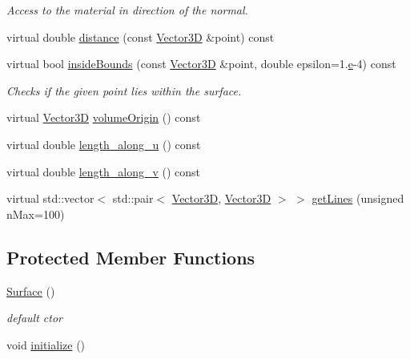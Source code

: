 \begin{DoxyCompactItemize}
\begin{DoxyCompactList}\small\item\em Access to the material in direction of the normal. \end{DoxyCompactList}\item 
virtual double \hyperlink{class_d_d4hep_1_1_d_d_rec_1_1_surface_ae673205d84823da5118cc1ae4a3403fb}{distance} (const \hyperlink{class_d_d_surfaces_1_1_vector3_d}{Vector3D} \&point) const
\item 
virtual bool \hyperlink{class_d_d4hep_1_1_d_d_rec_1_1_surface_a80a84ee1e6030a6df90f9cf6da06f041}{inside\+Bounds} (const \hyperlink{class_d_d_surfaces_1_1_vector3_d}{Vector3D} \&point, double epsilon=1.\hyperlink{_volumes_8cpp_a8a9a1f93e9b09afccaec215310e64142}{e}-\/4) const
\begin{DoxyCompactList}\small\item\em Checks if the given point lies within the surface. \end{DoxyCompactList}\item 
virtual \hyperlink{class_d_d_surfaces_1_1_vector3_d}{Vector3D} \hyperlink{class_d_d4hep_1_1_d_d_rec_1_1_surface_aef5510d93d3621e54f95fd3c62f8e5b3}{volume\+Origin} () const
\item 
virtual double \hyperlink{class_d_d4hep_1_1_d_d_rec_1_1_surface_afd98a91243f48c24fa45b3e812785401}{length\+\_\+along\+\_\+u} () const
\item 
virtual double \hyperlink{class_d_d4hep_1_1_d_d_rec_1_1_surface_ad28657a514fe91a4f5fa74cec1c3888d}{length\+\_\+along\+\_\+v} () const
\item 
virtual std\+::vector$<$ std\+::pair$<$ \hyperlink{class_d_d_surfaces_1_1_vector3_d}{Vector3D}, \hyperlink{class_d_d_surfaces_1_1_vector3_d}{Vector3D} $>$ $>$ \hyperlink{class_d_d4hep_1_1_d_d_rec_1_1_surface_a54c81a4857e760fd9abb6773a9c19301}{get\+Lines} (unsigned n\+Max=100)
\end{DoxyCompactItemize}
\subsection*{Protected Member Functions}
\begin{DoxyCompactItemize}
\item 
\hyperlink{class_d_d4hep_1_1_d_d_rec_1_1_surface_a9cbdd49c7183347839f20c80c114f0b6}{Surface} ()
\begin{DoxyCompactList}\small\item\em default c\textquotesingle{}tor \end{DoxyCompactList}\item 
void \hyperlink{class_d_d4hep_1_1_d_d_rec_1_1_surface_aeee7cc15facd37699acda7146f540fe1}{initialize} ()
\end{DoxyCompactItemize}
